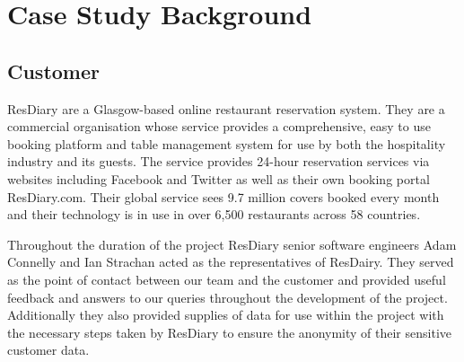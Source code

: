 \documentclass{l3proj}
\begin{document}
\newpage


\section{Case Study Background}
\label{sec:background}


\subsection{Customer}
\label{customer}


ResDiary are a Glasgow-based online restaurant reservation system. They are a commercial organisation whose service provides a comprehensive, easy to use booking platform and table management system for use by both the hospitality industry and its guests. The service provides 24-hour reservation services via websites including Facebook and Twitter as well as their own booking portal ResDiary.com. Their global service sees 9.7 million covers booked every month and their technology is in use in over 6,500 restaurants across 58 countries.

Throughout the duration of the project ResDiary senior software engineers Adam Connelly and Ian Strachan acted as the representatives of ResDairy. They served as the point of contact between our team and the customer and provided useful feedback and answers to our queries throughout the development of the project. Additionally they also provided supplies of data for use within the project with the necessary steps taken by ResDiary to ensure the anonymity of their sensitive customer data.
\end{document}
